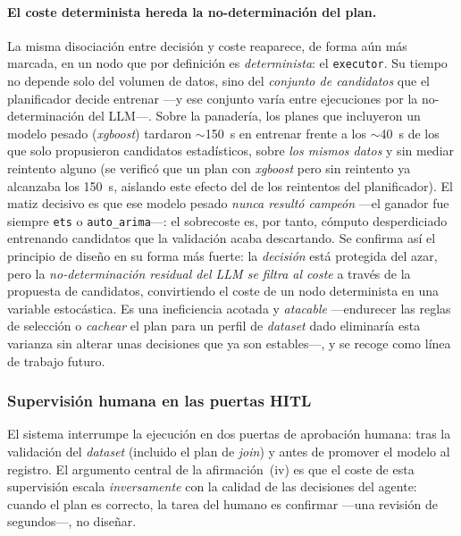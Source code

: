 \paragraph{El coste determinista hereda la no-determinación del plan.}
La misma disociación entre decisión y coste reaparece, de forma aún más marcada, en un
nodo que por definición es \emph{determinista}: el \texttt{executor}. Su tiempo no depende
solo del volumen de datos, sino del \emph{conjunto de candidatos} que el planificador
decide entrenar —y ese conjunto varía entre ejecuciones por la no-determinación del LLM—.
Sobre la panadería, los planes que incluyeron un modelo pesado (\textit{xgboost}) tardaron
$\sim$150~s en entrenar frente a los $\sim$40~s de los que solo propusieron candidatos
estadísticos, sobre \emph{los mismos datos} y sin mediar reintento alguno (se verificó que
un plan con \textit{xgboost} pero sin reintento ya alcanzaba los 150~s, aislando este
efecto del de los reintentos del planificador). El matiz decisivo es que ese modelo pesado
\emph{nunca resultó campeón} —el ganador fue siempre \texttt{ets} o \texttt{auto\_arima}—:
el sobrecoste es, por tanto, cómputo desperdiciado entrenando candidatos que la validación
acaba descartando. Se confirma así el principio de diseño en su forma más fuerte: la
\emph{decisión} está protegida del azar, pero la \emph{no-determinación residual del LLM se
filtra al coste} a través de la propuesta de candidatos, convirtiendo el coste de un nodo
determinista en una variable estocástica. Es una ineficiencia acotada y \emph{atacable}
—endurecer las reglas de selección o \emph{cachear} el plan para un perfil de
\textit{dataset} dado eliminaría esta varianza sin alterar unas decisiones que ya son
estables—, y se recoge como línea de trabajo futuro.


\subsubsection{Supervisión humana en las puertas HITL}
\label{sec:coste-hitl}

El sistema interrumpe la ejecución en dos puertas de aprobación humana: tras la
validación del \textit{dataset} (incluido el plan de \textit{join}) y antes de promover
el modelo al registro. El argumento central de la afirmación~(iv) es que el coste de
esta supervisión escala \emph{inversamente} con la calidad de las decisiones del agente:
cuando el plan es correcto, la tarea del humano es confirmar —una revisión de segundos—,
no diseñar.

